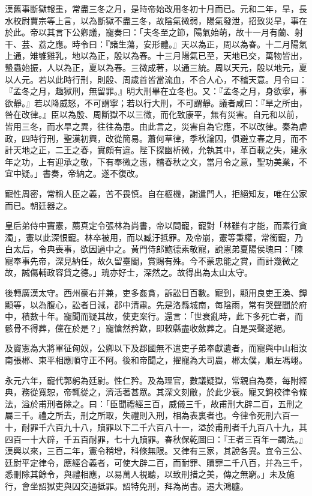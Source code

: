 \begin{pinyinscope}
漢舊事斷獄報重，常盡三冬之月，是時帝始改用冬初十月而已。元和二年，旱，長水校尉賈宗等上言，以為斷獄不盡三冬，故陰氣微弱，陽氣發泄，招致災旱，事在於此。帝以其言下公卿議，寵奏曰：「夫冬至之節，陽氣始萌，故十一月有蘭、射干、芸、荔之應。時令曰：『諸生蕩，安形體。』天以為正，周以為春。十二月陽氣上通，雉雊雞乳，地以為正，殷以為春。十三月陽氣已至，天地已交，萬物皆出，蟄蟲始振，人以為正，夏以為春。三微成著，以通三統。周以天元，殷以地元，夏以人元。若以此時行刑，則殷、周歲首皆當流血，不合人心，不稽天意。月令曰：『孟冬之月，趣獄刑，無留罪。』明大刑畢在立冬也。又：『孟冬之月，身欲寧，事欲靜。』若以降威怒，不可謂寧；若以行大刑，不可謂靜。議者咸曰：『旱之所由，咎在改律。』臣以為殷、周斷獄不以三微，而化致康平，無有災害。自元和以前，皆用三冬，而水旱之異，往往為患。由此言之，災害自為它應，不以改律。秦為虐政，四時行刑，聖漢初興，改從簡易。蕭何草律，季秋論囚，俱避立春之月，而不計天地之正，二王之春，實頗有違。陛下探幽析微，允執其中，革百載之失，建永年之功，上有迎承之敬，下有奉微之惠，稽春秋之文，當月令之意，聖功美業，不宜中疑。」書奏，帝納之。遂不復改。

寵性周密，常稱人臣之義，苦不畏慎。自在樞機，謝遣門人，拒絕知友，唯在公家而已。朝廷器之。

皇后弟侍中竇憲，薦真定令張林為尚書，帝以問寵，寵對「林雖有才能，而素行貪濁」，憲以此深恨寵。林卒被用，而以臧汙抵罪。及帝崩，憲等秉權，常銜寵，乃白太后，令典喪事，欲因過中之。黃門侍郎鮑德素敬寵，說憲弟夏陽侯瑰曰：「陳寵奉事先帝，深見納任，故久留臺閣，賞賜有殊。今不蒙忠能之賞，而計幾微之故，誠傷輔政容貸之德。」瑰亦好士，深然之。故得出為太山太守。

後轉廣漢太守。西州豪右并兼，吏多姦貪，訴訟日百數。寵到，顯用良吏王渙、鐔顯等，以為腹心，訟者日減，郡中清肅。先是洛縣城南，每陰雨，常有哭聲聞於府中，積數十年。寵聞而疑其故，使吏案行。還言：「世衰亂時，此下多死亡者，而骸骨不得葬，儻在於是？」寵愴然矜歎，即敕縣盡收斂葬之。自是哭聲遂絕。

及竇憲為大將軍征匈奴，公卿以下及郡國無不遣吏子弟奉獻遺者，而寵與中山相汝南張郴、東平相應順守正不阿。後和帝聞之，擢寵為大司農，郴太僕，順左馮翊。

永元六年，寵代郭躬為廷尉。性仁矜。及為理官，數議疑獄，常親自為奏，每附經典，務從寬恕，帝輒從之，濟活著甚眾。其深文刻敝，於此少衰。寵又鉤校律令條法，溢於甫刑者除之。曰：「臣聞禮經三百，威儀三千，故甫刑大辟二百，五刑之屬三千。禮之所去，刑之所取，失禮則入刑，相為表裏者也。今律令死刑六百一十，耐罪千六百九十八，贖罪以下二千六百八十一，溢於甫刑者千九百八十九，其四百一十大辟，千五百耐罪，七十九贖罪。春秋保乾圖曰：『王者三百年一蠲法。』漢興以來，三百二年，憲令稍增，科條無限。又律有三家，其說各異。宜令三公、廷尉平定律令，應經合義者，可使大辟二百，而耐罪、贖罪二千八百，并為三千，悉刪除其餘令，與禮相應，以易萬人視聽，以致刑措之美，傳之無窮。」未及施行，會坐詔獄吏與囚交通抵罪。詔特免刑，拜為尚書。遷大鴻臚。


\end{pinyinscope}
